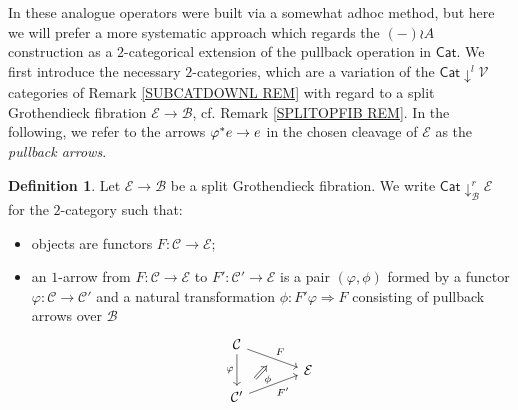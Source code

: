 \documentclass[a4paper,10pt
,draft
]{article}%
\numberwithin{equation}{section}
\numberwithin{figure}{section}
\theoremstyle{definition} %
\newtheorem{definition}[equation]{Definition}%
\newcommand{\Cat}{\mathsf{Cat}}
\newcommand{\V}{\ensuremath{\mathcal V}}
\newcommand{\1}{\ensuremath{\mathbbm 1}}%
\begin{document}
In \cite{BP_geo} these analogue operators were built via a somewhat adhoc method, but here we will prefer a more systematic approach which regards the $(-) \wr A$ construction as a $2$-categorical extension of the pullback operation in $\Cat$.
We first introduce the necessary $2$-categories,
which are a variation of the 
$\mathsf{Cat}\downarrow^l \V$
categories of Remark \ref{SUBCATDOWNL REM} with regard to 
a split Grothendieck fibration $\mathcal{E} \to \mathcal{B}$,
cf. Remark \ref{SPLITOPFIB REM}.
In the following, we refer to the arrows 
$\varphi^{\**}e \to e$ in
the chosen cleavage of $\mathcal{E}$ as the \emph{pullback arrows}.





\begin{definition}
Let $\mathcal{E} \to \mathcal{B}$ be a split Grothendieck fibration.
We write $\mathsf{Cat}\downarrow^r_{\mathcal{B}} \mathcal{E}$ for the $2$-category such that:
\begin{itemize}
	\item objects are functors $F \colon \mathcal{C} \to \mathcal{E}$; 
	
	\item an $1$-arrow from 
	$F \colon \mathcal{C} \to \mathcal{E}$
	to
	$F' \colon \mathcal{C}' \to \mathcal{E}$
	is a pair $(\varphi,\phi)$
	formed by a functor $\varphi\colon \mathcal{C} \to \mathcal{C}'$ and a natural transformation $\phi \colon F' \varphi \Rightarrow F$ consisting of pullback arrows over $\mathcal{B}$
		\begin{equation}
		\begin{tikzcd}[row sep = tiny, column sep = 35pt]
			\mathcal{C} \arrow{dr}[name=U]{F} \arrow{dd}[swap]{\varphi}
		\\
			& \mathcal{E}
		\\
			|[alias=V]| \mathcal{C}' \arrow{ur}[swap]{F'}
		\arrow[Rightarrow, from=V, to=U,shorten >=0.25cm,shorten <=0.25cm
		,swap,"\phi"
		]
		\end{tikzcd}
		\end{equation}


\end{itemize}
\end{definition}
\end{document}
